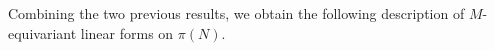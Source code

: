 \documentclass[11pt]{amsart}
\numberwithin{equation}{section}
\theoremstyle{plain}
\newtheorem{proposition}[theorem]{Proposition}
\theoremstyle{definition}
\theoremstyle{remark}
\newcommand{\C}{\mathbb{C}}
\newcommand{\one}{\mathds{1}}
\DeclareMathOperator{\Hom}{Hom}
\DeclareMathOperator{\vol}{vol}
\begin{document}
%
%	
%	

Combining the two previous results, we obtain the following description of $M$-equivariant linear forms on $\pi(N)$.
\end{document}
